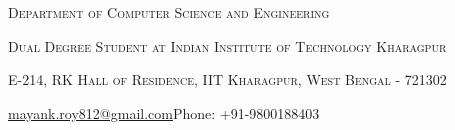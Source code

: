 \documentclass[a4paper,10pt]{extarticle} %
\begin{document}
\pagestyle{empty} %



\par{\par} %
\par{\centering\large {\textsc{Department of Computer Science and Engineering}}\par}\large
\par{\centering\large {\textsc{Dual Degree Student at Indian Institute of Technology Kharagpur}}\par}\large
\par{\centering\large {\textsc{E-214, RK Hall of Residence, IIT Kharagpur, West Bengal - 721302}}\par}\large
\hspace{3.5cm}\normalsize {\href{mailto:mayank.roy812@gmail.com}{mayank.roy812@gmail.com}}\hfill{Phone: +91-9800188403}\hspace{3.5cm}

%

\end{document}
